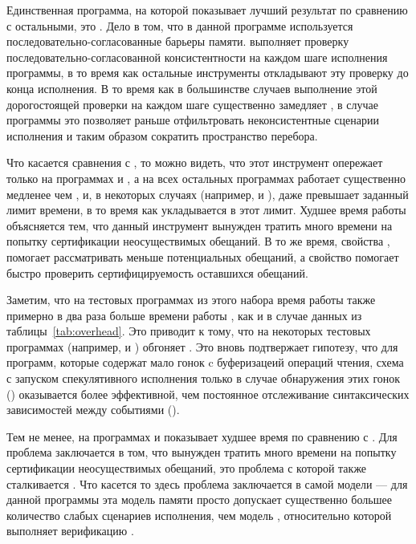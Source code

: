 Единственная программа, на которой \Nidhugg показывает 
лучший результат по сравнению с остальными, это .
Дело в том, что в данной программе используется 
последовательно-согласованные барьеры памяти.
\Nidhugg выполняет проверку последовательно-согласованной
консистентности на каждом шаге исполнения программы, в то время 
как остальные инструменты откладывают эту проверку до конца исполнения. 
В то время как в большинстве случаев выполнение этой дорогостоящей проверки 
на каждом шаге существенно замедляет \Nidhugg, 
в случае программы  это позволяет 
раньше отфильтровать неконсистентные сценарии исполнения 
и таким образом сократить пространство перебора. 

Что касается сравнения с \CDSChecker, то можно видеть,
что этот инструмент опережает \wmc только 
на программах  и , 
а на всех остальных программах \CDSChecker работает существенно 
медленее чем \wmc, и, в некоторых случаях 
(например,  и ), 
даже превышает заданный лимит времени, в то время как 
\wmc укладывается в этот лимит.
Худшее время работы \CDSChecker объясняется тем, что 
данный инструмент вынужден тратить много времени 
на попытку сертификации неосуществимых обещаний. 
В то же время, свойства \LBRF, помогает \wmc 
рассматривать меньше потенциальных обещаний, 
а свойство \CL помогает быстро проверить 
сертифицируемость оставшихся обещаний.  

Заметим, что на тестовых программах из этого набора 
время работы \hmc также примерно в два раза больше времени работы \genmc, 
как и в случае данных из таблицы~\ref{tab:overhead}.
Это приводит к тому, что на некоторых тестовых программах 
(например,  и ) \wmc обгоняет \hmc.
Это вновь подтвержает гипотезу, что для программ, 
которые содержат мало гонок c буферизацеий операций чтения, 
схема с запуском спекулятивного исполнения только в случае 
обнаружения этих гонок (\wmc) оказывается более эффективной, 
чем постоянное отслеживание синтаксических зависимостей между событиями (\hmc). 

Тем не менее, на программах  и 
\wmc показывает худшее время по сравнению с \hmc.
Для  проблема заключается в том, 
что \wmc вынужден тратить много времени 
на попытку сертификации неосуществимых обещаний, 
это проблема с которой также сталкивается \CDSChecker.
Что касется  то здесь проблема 
заключается в самой модели \WkmS --- для 
данной программы эта модель памяти просто допускает 
существенно большее количество слабых сценариев исполнения, 
чем модель \IMM, относительно которой выполняет верификацию \hmc. 

